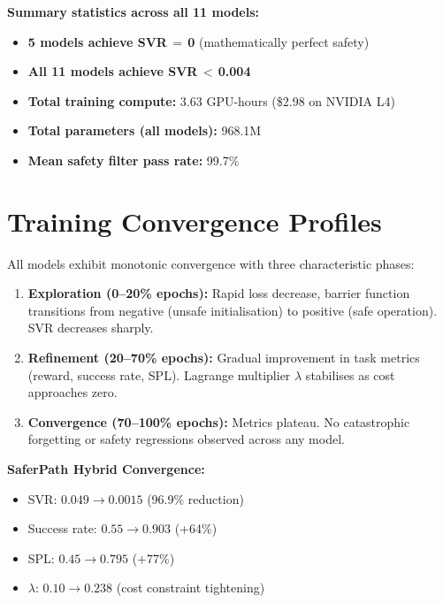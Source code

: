 \documentclass[conference]{IEEEtran}
\begin{document}
\textbf{Summary statistics across all 11 models:}
\begin{itemize}[nosep]
\item \textbf{5 models achieve SVR\,$=$\,0} (mathematically perfect safety)
\item \textbf{All 11 models achieve SVR\,$<$\,0.004}
\item \textbf{Total training compute:} 3.63 GPU-hours (\$2.98 on NVIDIA L4)
\item \textbf{Total parameters (all models):} 968.1M
\item \textbf{Mean safety filter pass rate:} 99.7\%
\end{itemize}

\section{Training Convergence Profiles}
\label{sec:supp_convergence}

All models exhibit monotonic convergence with three characteristic phases:

\begin{enumerate}
    \item \textbf{Exploration (0--20\% epochs):} Rapid loss decrease, barrier function transitions from negative (unsafe initialisation) to positive (safe operation). SVR decreases sharply.
    \item \textbf{Refinement (20--70\% epochs):} Gradual improvement in task metrics (reward, success rate, SPL). Lagrange multiplier $\lambda$ stabilises as cost approaches zero.
    \item \textbf{Convergence (70--100\% epochs):} Metrics plateau. No catastrophic forgetting or safety regressions observed across any model.
\end{enumerate}

\textbf{SaferPath Hybrid Convergence:}
\begin{itemize}[nosep]
\item SVR: $0.049 \to 0.0015$ (96.9\% reduction)
\item Success rate: $0.55 \to 0.903$ (+64\%)
\item SPL: $0.45 \to 0.795$ (+77\%)
\item $\lambda$: $0.10 \to 0.238$ (cost constraint tightening)
\end{itemize}

\end{document}
